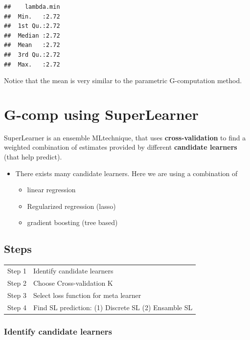\documentclass[
]{book}
\providecommand{\tightlist}{%
  \setlength{\itemsep}{0pt}\setlength{\parskip}{0pt}}
\begin{document}
\begin{verbatim}
##    lambda.min  
##  Min.   :2.72  
##  1st Qu.:2.72  
##  Median :2.72  
##  Mean   :2.72  
##  3rd Qu.:2.72  
##  Max.   :2.72
\end{verbatim}

Notice that the mean is very similar to the parametric G-computation method.

\hypertarget{g-comp-using-superlearner}{%
\section{G-comp using SuperLearner}\label{g-comp-using-superlearner}}

\begin{rmdcomment}
SuperLearner is an ensemble MLtechnique, that uses
\textbf{cross-validation} to find a weighted combination of estimates
provided by different \textbf{candidate learners} (that help predict).
\end{rmdcomment}

\begin{itemize}
\tightlist
\item
  There exists many candidate learners. Here we are using a combination of

  \begin{itemize}
  \tightlist
  \item
    linear regression
  \item
    Regularized regression (lasso)
  \item
    gradient boosting (tree based)
  \end{itemize}
\end{itemize}

\hypertarget{steps-1}{%
\subsection{Steps}\label{steps-1}}

\begin{longtable}[]{@{}ll@{}}
\toprule
\endhead
Step 1 & Identify candidate learners\tabularnewline
Step 2 & Choose Cross-validation K\tabularnewline
Step 3 & Select loss function for meta learner\tabularnewline
Step 4 & Find SL prediction: (1) Discrete SL (2) Ensamble SL\tabularnewline
\bottomrule
\end{longtable}

\hypertarget{identify-candidate-learners}{%
\subsubsection{Identify candidate learners}\label{identify-candidate-learners}}
\end{document}
